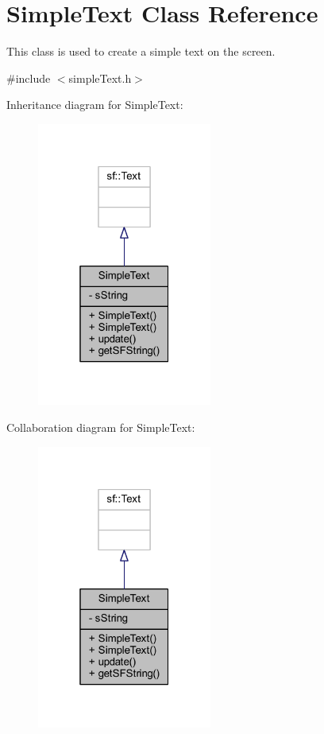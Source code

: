 \hypertarget{class_simple_text}{}\section{Simple\+Text Class Reference}
\label{class_simple_text}


This class is used to create a simple text on the screen.  




{\ttfamily \#include $<$simple\+Text.\+h$>$}



Inheritance diagram for Simple\+Text\+:\nopagebreak
\begin{figure}[H]
\begin{center}
\leavevmode
\includegraphics[width=163pt]{class_simple_text__inherit__graph}
\end{center}
\end{figure}


Collaboration diagram for Simple\+Text\+:\nopagebreak
\begin{figure}[H]
\begin{center}
\leavevmode
\includegraphics[width=163pt]{class_simple_text__coll__graph}
\end{center}
\end{figure}
